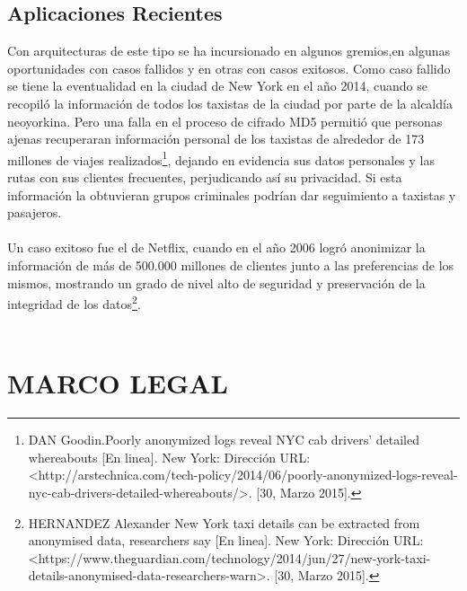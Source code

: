 \documentclass[a4paper,openright,12pt]{book}
\theoremstyle{definition}
\theoremstyle{remark}
\begin{document}
\subsection{Aplicaciones Recientes}
Con arquitecturas de  este  tipo se ha incursionado  en  algunos gremios,en algunas oportunidades con casos fallidos  y en otras con casos exitosos. Como caso fallido se tiene  la eventualidad en la  ciudad de New York en el año 2014, cuando se recopiló la información de todos los taxistas de la ciudad por parte de la alcaldía neoyorkina. Pero una falla en el proceso de cifrado MD5 permitió que personas ajenas recuperaran información personal de los taxistas de alrededor de 173 millones de viajes realizados\footnote{DAN Goodin.Poorly anonymized logs reveal NYC cab drivers’ detailed whereabouts [En linea]. New York: Dirección URL: <http://arstechnica.com/tech-policy/2014/06/poorly-anonymized-logs-reveal-nyc-cab-drivers-detailed-whereabouts/>. [30, Marzo 2015].}, dejando en evidencia sus datos personales y las rutas con sus clientes frecuentes,  perjudicando así su privacidad. Si esta información la obtuvieran grupos criminales podrían dar seguimiento a taxistas y pasajeros.\\\\
Un caso exitoso fue el de Netflix, cuando en el año 2006 logró anonimizar la información de más de 500.000 millones de clientes junto a las preferencias de los mismos, mostrando un grado de nivel alto de seguridad y preservación de la integridad de los datos\footnote{HERNANDEZ Alexander New York taxi details can be extracted from anonymised data, researchers say [En linea]. New York: Dirección URL: <https://www.theguardian.com/technology/2014/jun/27/new-york-taxi-details-anonymised-data-researchers-warn>. [30, Marzo 2015].}.\\\\

\section{MARCO LEGAL}
\end{document}
